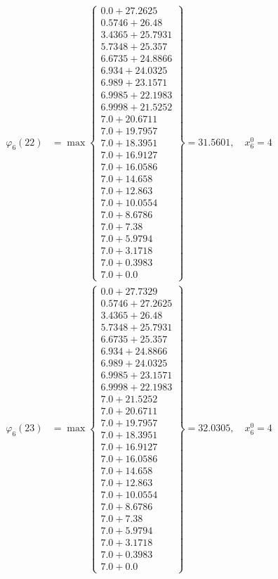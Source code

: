 \documentclass{article}
\begin{document}
\begin{align*}
\varphi_{6}(22) &= \max \left\{ \begin{array}{c}
0.0 + 27.2625 \\
 0.5746 + 26.48 \\
 3.4365 + 25.7931 \\
 5.7348 + 25.357 \\
 6.6735 + 24.8866 \\
 6.934 + 24.0325 \\
 6.989 + 23.1571 \\
 6.9985 + 22.1983 \\
 6.9998 + 21.5252 \\
 7.0 + 20.6711 \\
 7.0 + 19.7957 \\
 7.0 + 18.3951 \\
 7.0 + 16.9127 \\
 7.0 + 16.0586 \\
 7.0 + 14.658 \\
 7.0 + 12.863 \\
 7.0 + 10.0554 \\
 7.0 + 8.6786 \\
 7.0 + 7.38 \\
 7.0 + 5.9794 \\
 7.0 + 3.1718 \\
 7.0 + 0.3983 \\
 7.0 + 0.0
\end{array} \right\}=31.5601, \quad x_{6}^0=4\\
  
\varphi_{6}(23) &= \max \left\{ \begin{array}{c}
0.0 + 27.7329 \\
 0.5746 + 27.2625 \\
 3.4365 + 26.48 \\
 5.7348 + 25.7931 \\
 6.6735 + 25.357 \\
 6.934 + 24.8866 \\
 6.989 + 24.0325 \\
 6.9985 + 23.1571 \\
 6.9998 + 22.1983 \\
 7.0 + 21.5252 \\
 7.0 + 20.6711 \\
 7.0 + 19.7957 \\
 7.0 + 18.3951 \\
 7.0 + 16.9127 \\
 7.0 + 16.0586 \\
 7.0 + 14.658 \\
 7.0 + 12.863 \\
 7.0 + 10.0554 \\
 7.0 + 8.6786 \\
 7.0 + 7.38 \\
 7.0 + 5.9794 \\
 7.0 + 3.1718 \\
 7.0 + 0.3983 \\
 7.0 + 0.0
\end{array} \right\}=32.0305, \quad x_{6}^0=4\\
  

\end{align*}
\end{document}
